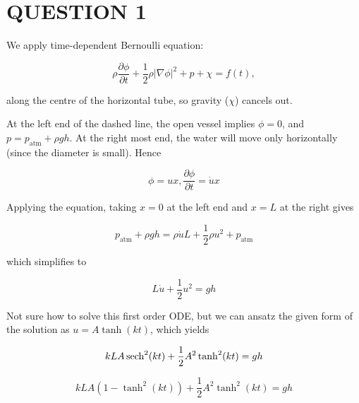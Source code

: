 \documentclass[a4paper]{article}
\begin{document}
	
\maketitle

\section{QUESTION 1}

 \begin{center}
	
\end{center}

We apply time-dependent Bernoulli equation:

\[
\rho \frac{\partial\phi}{\partial t} + \frac{1}{2} \rho |\nabla \phi|^2 + p + \chi = f(t),
\]

along the centre of the horizontal tube, so gravity ($ \chi $) cancels out.

At the left end of the dashed line, the open vessel implies $ \phi = 0 $, and $ p = p_{\text{atm}} + \rho g h $. At the right most end, the water will move only horizontally (since the diameter is small). Hence 

\[ \phi = u x, \frac{\partial \phi }{\partial t} = \dot{u} x \]

Applying the equation, taking $ x = 0 $ at the left end and $ x = L $ at the right gives 

\[  p_{\text{atm}} + \rho g h = \rho \dot{u} L + \frac{1}{2} \rho u^{2} +  p_{\text{atm}}  \]

which simplifies to 

\[ L \dot{u} + \frac{1}{2} u^{2} = g h \]

Not sure how to solve this first order ODE, but we can ansatz the given form of the solution as $ u = A \tanh (k t) $, which yields

\[ k L A \operatorname{sech}^{2}(kt) + \frac{1}{2} A^{2}\tanh^{2} (k t) = g h \]

\[ k L A ( 1  - \tanh^{2} (k t) ) + \frac{1}{2} A^2 \tanh^{2} (k t) = g h \]
\end{document}
